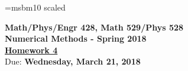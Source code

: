 \documentclass [12pt]{article}
\begin{document}
\def\e{\mathop{\rm e}\nolimits}
\def\abs{\mathop{\rm abs}\nolimits}
\def\sign{\mathop{\rm sign}\nolimits}
\font\bb=msbm10 scaled  %
\def\R{\hbox{\bb R}}

\noindent
\begin{center}
{ \bf  {Math/Phys/Engr 428, Math 529/Phys 528 \\
Numerical Methods - Spring 2018 }}\\[7pt]
\underline{\bf Homework 4}\\

Due: {\bf Wednesday, March 21, 2018}

\end{center}
\end{document}
